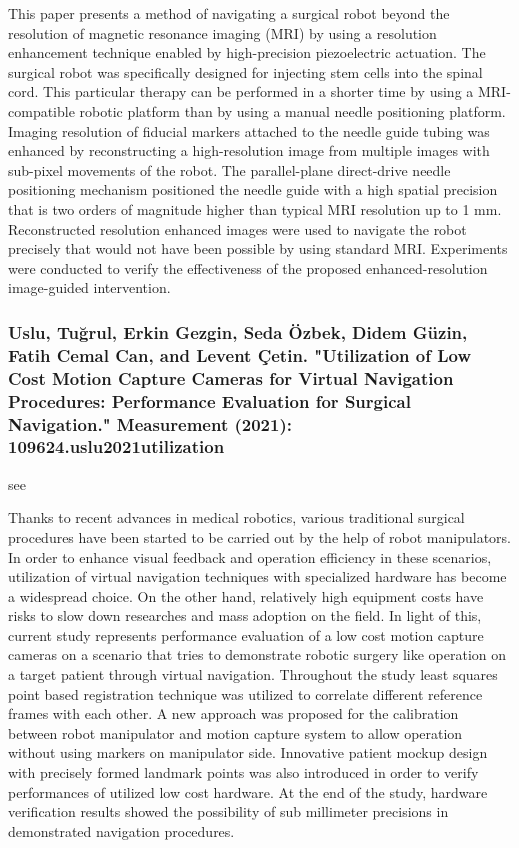 \documentclass[conference]{IEEEtran}
\begin{document}
This paper presents a method of navigating a surgical robot beyond the resolution of magnetic resonance imaging (MRI) by using a resolution enhancement technique enabled by high-precision piezoelectric actuation. The surgical robot was specifically designed for injecting stem cells into the spinal cord. This particular therapy can be performed in a shorter time by using a MRI-compatible robotic platform than by using a manual needle positioning platform. Imaging resolution of fiducial markers attached to the needle guide tubing was enhanced by reconstructing a high-resolution image from multiple images with sub-pixel movements of the robot. The parallel-plane direct-drive needle positioning mechanism positioned the needle guide with a high spatial precision that is two orders of magnitude higher than typical MRI resolution up to 1 mm. Reconstructed resolution enhanced images were used to navigate the robot precisely that would not have been possible by using standard MRI. Experiments were conducted to verify the effectiveness of the proposed enhanced-resolution image-guided intervention.

\medskip
\subsubsection{Uslu, Tuğrul, Erkin Gezgin, Seda Özbek, Didem Güzin, Fatih Cemal Can, and Levent Çetin. "Utilization of Low Cost Motion Capture Cameras for Virtual Navigation Procedures: Performance Evaluation for Surgical Navigation." Measurement (2021): 109624.uslu2021utilization}
see \cite{uslu2021utilization}

Thanks to recent advances in medical robotics, various traditional surgical procedures have been started to be carried out by the help of robot manipulators. In order to enhance visual feedback and operation efficiency in these scenarios, utilization of virtual navigation techniques with specialized hardware has become a widespread choice. On the other hand, relatively high equipment costs have risks to slow down researches and mass adoption on the field. In light of this, current study represents performance evaluation of a low cost motion capture cameras on a scenario that tries to demonstrate robotic surgery like operation on a target patient through virtual navigation. Throughout the study least squares point based registration technique was utilized to correlate different reference frames with each other. A new approach was proposed for the calibration between robot manipulator and motion capture system to allow operation without using markers on manipulator side. Innovative patient mockup design with precisely formed landmark points was also introduced in order to verify performances of utilized low cost hardware. At the end of the study, hardware verification results showed the possibility of sub millimeter precisions in demonstrated navigation procedures.
\end{document}
